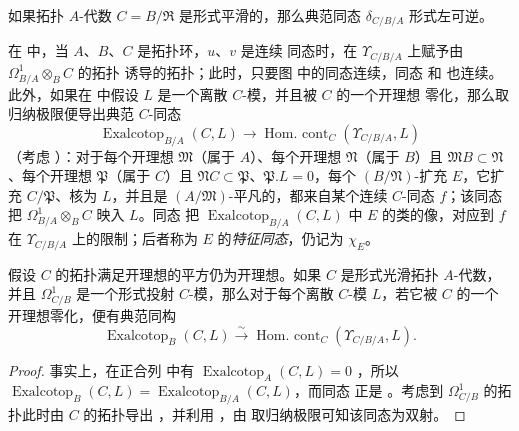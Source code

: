 \begin{corollary}[20.7.9]
\label{0.20.7.9-fr}
如果拓扑 $A$-代数 $C=B/\mathfrak{R}$ 是形式平滑的，那么典范同态
$\delta_{C/B/A}$ 形式左可逆。
\end{corollary}

\begin{env}[20.7.10]
\label{0.20.7.10-fr}
在  中，当 $A$、$B$、$C$ 是拓扑环，$u$、$v$ 是连续
同态时，在 $\Upsilon_{C/B/A}$ 上赋予由 $\Omega^1_{B/A}\otimes_B C$ 的拓扑
诱导的拓扑；此时，只要图  中的同态连续，同态
 和  也连续。此外，如果在
 中假设 $L$ 是一个离散 $C$-模，并且被 $C$ 的一个开理想
零化，那么取归纳极限便导出典范 $C$-同态
\begin{equation}
\tag{20.7.10.1}
\label{0.20.7.10.1-fr}
  \operatorname{Exalcotop}_{B/A}(C,L)\to
  \operatorname{Hom.\ cont}_C(\Upsilon_{C/B/A},L)
\end{equation}
（考虑 ）：对于每个开理想 $\mathfrak{M}$（属于
$A$）、每个开理想 $\mathfrak{N}$（属于 $B$）且
$\mathfrak{M}B\subset\mathfrak{N}$、每个开理想 $\mathfrak{P}$（属于 $C$）且
$\mathfrak{N}C\subset\mathfrak{P}$、$\mathfrak{P}.L=0$，每个
$(B/\mathfrak{N})$-扩充 $E$，它扩充 $C/\mathfrak{P}$、核为 $L$，并且是
$(A/\mathfrak{M})$-平凡的，都来自某个连续 $C$-同态 $f$；该同态把
$\Omega^1_{B/A}\otimes_B C$ 映入 $L$。同态  把
$\operatorname{Exalcotop}_{B/A}(C,L)$ 中 $E$ 的类的像，对应到 $f$ 在
$\Upsilon_{C/B/A}$ 上的限制；后者称为 $E$ 的\emph{特征同态}，仍记为
$\chi_E$。
\end{env}

\begin{proposition}[20.7.11]
\label{0.20.7.11-fr}
假设 $C$ 的拓扑满足开理想的平方仍为开理想。如果 $C$ 是形式光滑拓扑
$A$-代数，并且 $\Omega^1_{C/B}$ 是一个形式投射 $C$-模，那么对于每个离散
$C$-模 $L$，若它被 $C$ 的一个开理想零化，便有典范同构
\begin{equation}
\tag{20.7.11.1}
\label{0.20.7.11.1-fr}
  \operatorname{Exalcotop}_B(C,L)\xrightarrow{\sim}
  \operatorname{Hom.\ cont}_C(\Upsilon_{C/B/A},L).
\end{equation}
\end{proposition}

\begin{proof}
事实上，在正合列  中有
$\operatorname{Exalcotop}_A(C,L)=0$ ，所以
$\operatorname{Exalcotop}_B(C,L)=\operatorname{Exalcotop}_{B/A}(C,L)$，而同态
 正是 。考虑到
$\Omega^1_{C/B}$ 的拓扑此时由 $C$ 的拓扑导出 ，并利用
，由  取归纳极限可知该同态为双射。
\end{proof}


